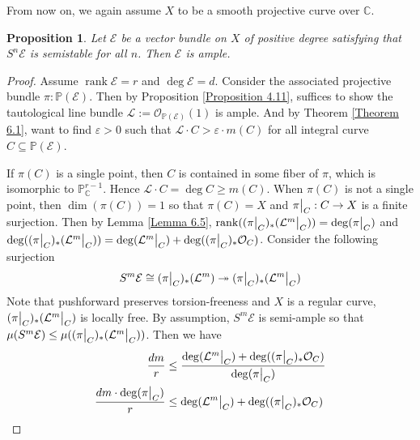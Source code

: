 \documentclass{ctexart}
\newtheorem{proposition}{Proposition}[section]
\newcommand{\rank}{\operatorname{rank}}
\begin{document}
From now on, we again assume $X$ to be a smooth projective curve over $\mathbb{C}$.
\begin{proposition}
    Let $\mathcal{E}$ be a vector bundle on $X$ of positive degree satisfying that $S^{n}\mathcal{E}$ is semistable for all $n$.
    Then $\mathcal{E}$ is ample.
    \label{Proposition 6.9}
\end{proposition}
\begin{proof}
    Assume $\rank \mathcal{E} = r$ and $\deg \mathcal{E} = d$.
    Consider the associated projective bundle $\pi: \mathbb{P}(\mathcal{E})$.
    Then by Proposition \ref{Proposition 4.11}, suffices to show the tautological line bundle $\mathcal{L} := \mathcal{O}_{\mathbb{P}(\mathcal{E})}(1)$ is ample.
    And by Theorem \ref{Theorem 6.1}, want to find $\varepsilon > 0$ such that $\mathcal{L} \cdot C > \varepsilon \cdot m(C)$ for all integral curve $C \subseteq \mathbb{P}(\mathcal{E})$.
    \par
    If $\pi(C)$ is a single point, then $C$ is contained in some fiber of $\pi$, which is isomorphic to $\mathbb{P}_{\mathbb{C}}^{r - 1}$.
    Hence $\mathcal{L} \cdot C = \deg C \ge m(C)$.
    When $\pi(C)$ is not a single point, then $\dim (\pi(C)) = 1$ so that $\pi(C) = X$ and $\pi\big{|}_{C}: C \rightarrow X$ is a finite surjection.
    Then by Lemma \ref{Lemma 6.5}, $\rank ((\pi\big{|}_{C})_{\ast}(\mathcal{L}^{m}\big{|}_{C})) = \deg (\pi\big{|}_{C})$ and $\deg ((\pi\big{|}_{C})_{\ast}(\mathcal{L}^{m}\big{|}_{C})) = \deg (\mathcal{L}^{m}\big{|}_{C}) + \deg ((\pi\big{|}_{C})_{\ast}\mathcal{O}_{C})$.
    Consider the following surjection
    \begin{equation}
        S^{m}\mathcal{E} \cong (\pi\big{|}_{C})_{\ast}(\mathcal{L}^{m}) \twoheadrightarrow (\pi\big{|}_{C})_{\ast}(\mathcal{L}^{m}\big{|}_{C})
    \end{equation}
    Note that pushforward preserves torsion-freeness and $X$ is a regular curve, $(\pi\big{|}_{C})_{\ast}(\mathcal{L}^{m}\big{|}_{C})$ is locally free.
    By assumption, $S^{m}\mathcal{E}$ is semi-ample so that $\mu(S^{m}\mathcal{E}) \le \mu((\pi\big{|}_{C})_{\ast}(\mathcal{L}^{m}\big{|}_{C}))$.
    Then we have
    \begin{equation}
        \begin{split}
            \frac{dm}{r} & \le \frac{\deg (\mathcal{L}^{m}\big{|}_{C}) + \deg ((\pi\big{|}_{C})_{\ast}\mathcal{O}_{C})}{\deg (\pi\big{|}_{C})} \\
            \frac{dm \cdot \deg (\pi\big{|}_{C})}{r} & \le \deg (\mathcal{L}^{m}\big{|}_{C}) + \deg ((\pi\big{|}_{C})_{\ast}\mathcal{O}_{C}) \\

\end{split}
\end{equation}
\end{proof}
\end{document}
